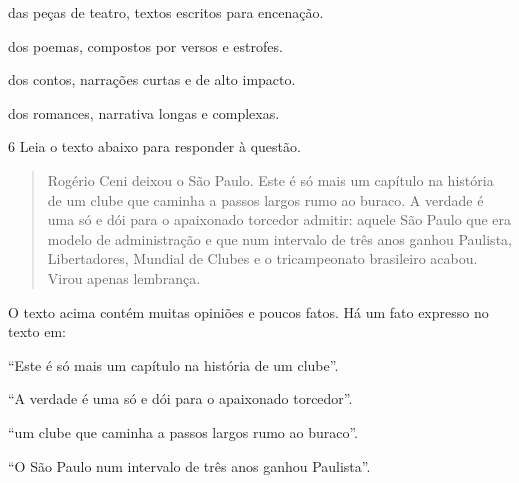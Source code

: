 \begin{escolha}

  \item das peças de teatro, textos escritos para encenação.

  \item dos poemas, compostos por versos e estrofes.

  \item dos contos, narrações curtas e de alto impacto.

  \item dos romances, narrativa longas e complexas.

\end{escolha}

\num{6} Leia o texto abaixo para responder à questão. 

\begin{quote}

Rogério Ceni deixou o São Paulo. Este é só mais um capítulo na história
de um clube que caminha a passos largos rumo ao buraco. A verdade é uma
só e dói para o apaixonado torcedor admitir: aquele São Paulo que era
modelo de administração e que num intervalo de três anos ganhou
Paulista, Libertadores, Mundial de Clubes e o tricampeonato brasileiro
acabou. Virou apenas lembrança.

\end{quote}


O texto acima contém muitas opiniões e poucos fatos. Há um fato
expresso no texto em:

\begin{escolha}

  \item ``Este é só mais um capítulo na história de um clube''.
  
  \item ``A verdade é uma só e dói para o apaixonado torcedor''.
  
  \item ``um clube que caminha a passos largos rumo ao buraco''.
  
  \item ``O São Paulo num intervalo de três anos ganhou Paulista''.

\end{escolha}

